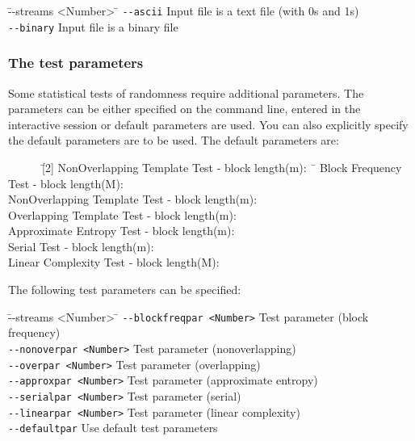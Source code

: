 \documentclass[12pt]{article}
\begin{document}
\begin{tabbing}
\= --streams <Number>\hspace{40mm} \= \kill
\>\verb|--ascii|   \>Input file is a text file (with 0s and 1s)\\
\>\verb|--binary|  \>Input file is a binary file
\end{tabbing}

\subsubsection*{The test parameters}
Some statistical tests of randomness require additional parameters. The parameters can be either specified on the command line, entered in the interactive session or default parameters are used. You can also explicitly specify the default parameters are to be used. The default parameters are:

\begin{tabbing}
\ \ \ \ \ \ \= [2] NonOverlapping Template Test - block length(m): \ \= \kill
    \>Block Frequency Test - block length(M):          \\
    \>NonOverlapping Template Test - block length(m): \\
    \>Overlapping Template Test - block length(m):    \\
    \>Approximate Entropy Test - block length(m):     \\
    \>Serial Test - block length(m):                  \\
    \>Linear Complexity Test - block length(M):       
\end{tabbing}

The following test parameters can be specified:
\begin{tabbing}
\= --streams <Number>\hspace{40mm} \= \kill
\>\verb|--blockfreqpar <Number>|                 \>Test parameter (block frequency)\\
\>\verb|--nonoverpar <Number>|            \>Test parameter (nonoverlapping)\\
\>\verb|--overpar <Number>|              \>Test parameter (overlapping)\\
\>\verb|--approxpar <Number>|                 \>Test parameter (approximate entropy)\\
\>\verb|--serialpar <Number>|            \>Test parameter (serial)\\
\>\verb|--linearpar <Number>|              \>Test parameter (linear complexity)\\
\>\verb|--defaultpar|              \>Use default test parameters
\end{tabbing}
\end{document}
